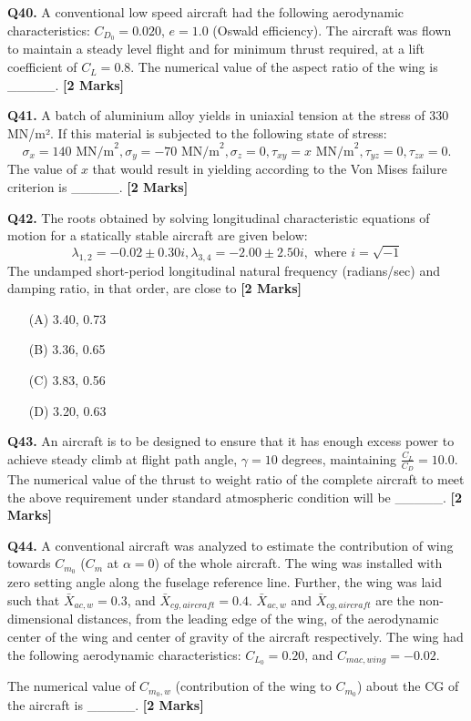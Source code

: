 \documentclass[11pt]{article}
\newcommand{\questionb}[2]{
    \noindent\textbf{Q#2.} #1 \hfill \textbf{[2 Marks]}
}
\begin{document}
\vspace{0.5cm}

\questionb{A conventional low speed aircraft had the following aerodynamic characteristics: $C_{D_0} = 0.020$, $e = 1.0$ (Oswald efficiency). The aircraft was flown to maintain a steady level flight and for minimum thrust required, at a lift coefficient of $C_L = 0.8$. The numerical value of the aspect ratio of the wing is \_\_\_\_\_.}{40}

\vspace{0.5cm}

\questionb{A batch of aluminium alloy yields in uniaxial tension at the stress of 330 MN/m². If this material is subjected to the following state of stress:
\[
\sigma_x = 140 \text{ MN/m}^2, \sigma_y = -70 \text{ MN/m}^2, \sigma_z = 0, \tau_{xy} = x \text{ MN/m}^2, \tau_{yz} = 0, \tau_{zx} = 0.
\]
The value of $x$ that would result in yielding according to the Von Mises failure criterion is \_\_\_\_\_.}{41}

\vspace{0.5cm}

\questionb{The roots obtained by solving longitudinal characteristic equations of motion for a statically stable aircraft are given below:
\[
\lambda_{1,2} = -0.02 \pm 0.30i, \lambda_{3,4} = -2.00 \pm 2.50i, \text{ where } i = \sqrt{-1}
\]
The undamped short-period longitudinal natural frequency (radians/sec) and damping ratio, in that order, are close to}{42}
\begin{enumerate}
    \item[(A)] 3.40, 0.73
    \item[(B)] 3.36, 0.65
    \item[(C)] 3.83, 0.56
    \item[(D)] 3.20, 0.63
\end{enumerate}

\vspace{0.5cm}

\questionb{An aircraft is to be designed to ensure that it has enough excess power to achieve steady climb at flight path angle, $\gamma = 10$ degrees, maintaining $\frac{C_L}{C_D} = 10.0$. The numerical value of the thrust to weight ratio of the complete aircraft to meet the above requirement under standard atmospheric condition will be \_\_\_\_\_.}{43}

\vspace{0.5cm}

\questionb{A conventional aircraft was analyzed to estimate the contribution of wing towards $C_{m_0}$ ($C_m$ at $\alpha = 0$) of the whole aircraft. The wing was installed with zero setting angle along the fuselage reference line. Further, the wing was laid such that $\bar{X}_{ac,w} = 0.3$, and $\bar{X}_{cg,aircraft} = 0.4$. $\bar{X}_{ac,w}$ and $\bar{X}_{cg,aircraft}$ are the non-dimensional distances, from the leading edge of the wing, of the aerodynamic center of the wing and center of gravity of the aircraft respectively. The wing had the following aerodynamic characteristics:
$C_{L_0} = 0.20$, and $C_{mac,wing} = -0.02$. 

The numerical value of $C_{m_0,w}$ (contribution of the wing to $C_{m_0}$) about the CG of the aircraft is \_\_\_\_\_.}{44}
\end{document}
